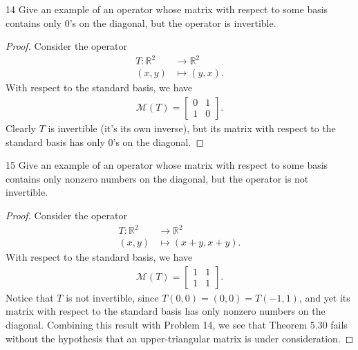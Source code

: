 \documentclass[11pt]{extarticle}
\newenvironment{problem}[1]{\begin{prob*}{#1}{}}{\end{prob*}}
\newcommand{\R}{\mathbb{R}}
\newcommand{\mat}{\mathcal{M}}
\begin{document}
\begin{problem}{14}
Give an example of an operator whose matrix with respect to some basis contains only $0$'s on the diagonal, but the operator is invertible.
\end{problem}
\begin{proof}
Consider the operator 
\begin{align*}
T: \R^2 &\to \R^2 \\
    (x,y) &\mapsto (y,x).
\end{align*}
With respect to the standard basis, we have 
\begin{align*}
\mat(T) = \begin{bmatrix} 0 & 1\\ 1 & 0\end{bmatrix}.
\end{align*}
Clearly $T$ is invertible (it's its own inverse), but its matrix with respect to the standard basis has only $0$'s on the diagonal.
\end{proof}

\begin{problem}{15}
Give an example of an operator whose matrix with respect to some basis contains only nonzero numbers on the diagonal, but the operator is not invertible.
\end{problem}
\begin{proof}
Consider the operator
\begin{align*}
T: \R^2 &\to \R^2\\
(x,y) &\mapsto (x + y, x + y).
\end{align*}
With respect to the standard basis, we have
\begin{align*}
\mat(T) = \begin{bmatrix} 1 & 1\\ 1 & 1\end{bmatrix}.
\end{align*}
Notice that $T$ is not invertible, since $T(0, 0) = (0, 0) = T(-1, 1)$, and yet its matrix with respect to the standard basis has only nonzero numbers on the diagonal.  Combining this result with Problem 14, we see that Theorem 5.30 fails without the hypothesis that an upper-triangular matrix is under consideration.
\end{proof}
\end{document}

